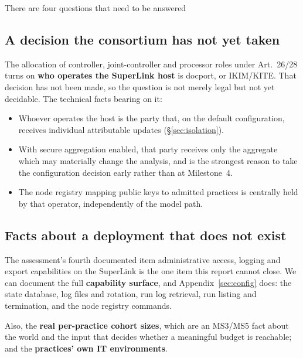 \label{sec:outside}
\statusOutside

\begin{shortanswer}
There are four questions that need to be answered
\end{shortanswer}

\subsection{A decision the consortium has not yet taken}

The allocation of controller, joint-controller and processor roles under Art.~26/28 turns on
\textbf{who operates the SuperLink host} is docport, or IKIM/KITE. That decision has not been made,
so the question is not merely legal but not yet decidable. The technical facts bearing on it:

\begin{itemize}
  \item Whoever operates the host is the party that, on the default configuration, receives
        individual attributable updates (\S\ref{sec:isolation}).
  \item With secure aggregation enabled, that party receives only the aggregate which may
        materially change the analysis, and is the strongest reason to take the configuration
        decision early rather than at Milestone~4.
  \item The node registry mapping public keys to admitted practices is centrally held by that
        operator, independently of the model path.
\end{itemize}

\subsection{Facts about a deployment that does not exist}

The assessment's fourth documented item administrative access, logging and export capabilities
on the SuperLink is the one item this report cannot close. We can document the full
\textbf{capability surface}, and Appendix~\ref{sec:config} does: the state database, log files and
rotation, run log retrieval, run listing and termination, and the node registry commands.

Also, the \textbf{real per-practice cohort sizes}, which are an MS3/MS5 fact about the world
and the input that decides whether a meaningful budget is reachable; and the \textbf{practices' own
IT environments}.
